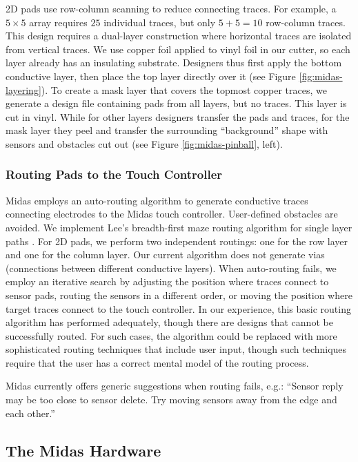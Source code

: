 2D pads use row-column scanning to reduce connecting traces.
For example, a $5 × 5$ array requires $25$ individual traces, but
only $5 + 5 = 10$ row-column traces. This design requires a
dual-layer construction where horizontal traces are isolated
from vertical traces. We use copper foil applied to vinyl foil
in our cutter, so each layer already has an insulating substrate.
Designers thus first apply the bottom conductive layer,
then place the top layer directly over it (see Figure \ref{fig:midas-layering}).
To create a mask layer that covers the topmost copper traces,
we generate a design file containing pads from all layers, but
no traces. This layer is cut in vinyl. While for other layers
designers transfer the pads and traces, for the mask layer they
peel and transfer the surrounding “background” shape with
sensors and obstacles cut out (see Figure \ref{fig:midas-pinball}, left).


        \subsubsection{Routing Pads to the Touch Controller}
Midas employs an auto-routing algorithm to generate conductive
traces connecting electrodes to the Midas touch controller.
User-defined obstacles are avoided. We implement
Lee's breadth-first maze routing algorithm for single layer
paths \cite{lee-maze}. For 2D pads, we perform two independent routings:
one for the row layer and one for the column layer. Our
current algorithm does not generate vias (connections between
different conductive layers). When auto-routing fails,
we employ an iterative search by adjusting the position where
traces connect to sensor pads, routing the sensors in a different
order, or moving the position where target traces connect
to the touch controller. In our experience, this basic routing
algorithm has performed adequately, though there are designs
that cannot be successfully routed. For such cases, the
algorithm could be replaced with more sophisticated routing
techniques that include user input, though such techniques
require that the user has a correct mental model of the routing
process.

Midas currently offers generic suggestions when routing fails,
e.g.: “Sensor reply may be too close to sensor delete. Try
moving sensors away from the edge and each other.”


    \subsection{The Midas Hardware}

